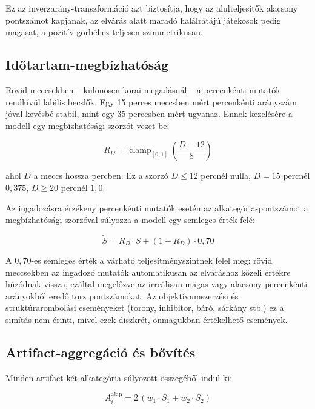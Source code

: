 ﻿\documentclass[a4paper,12pt]{report}
\begin{document}
Ez az inverzarány-transzformáció azt biztosítja, hogy az alulteljesítők alacsony pontszámot kapjanak, az elvárás alatt maradó halálrátájú játékosok pedig magasat, a pozitív görbéhez teljesen szimmetrikusan.

\subsection{Időtartam-megbízhatóság}

Rövid meccsekben -- különösen korai megadásnál -- a percenkénti mutatók rendkívül labilis becslők. Egy 15 perces meccsben mért percenkénti arányszám jóval kevésbé stabil, mint egy 35 percesben mért ugyanaz. Ennek kezelésére a modell egy megbízhatósági szorzót vezet be:

\begin{equation}
R_D = \operatorname{clamp}_{[0,1]}\!\left(\frac{D - 12}{8}\right)
\end{equation}

ahol $D$ a meccs hossza percben. Ez a szorzó $D \le 12$ percnél nulla, $D = 15$ percnél $0{,}375$, $D \ge 20$ percnél $1{,}0$.

Az ingadozásra érzékeny percenkénti mutatók esetén az alkategória-pontszámot a megbízhatósági szorzóval súlyozza a modell egy semleges érték felé:

\begin{equation}
\tilde{S} = R_D \cdot S + (1 - R_D) \cdot 0{,}70
\end{equation}

A $0{,}70$-es semleges érték a várható teljesítményszintnek felel meg: rövid meccsekben az ingadozó mutatók automatikusan az elváráshoz közeli értékre húzódnak vissza, ezáltal megelőzve az irreálisan magas vagy alacsony percenkénti arányokból eredő torz pontszámokat. Az objektívumszerzési és struktúrarombolási eseményeket (torony, inhibitor, báró, sárkány stb.) ez a simítás nem érinti, mivel ezek diszkrét, önmagukban értékelhető események.

\subsection{Artifact-aggregáció és bővítés}

Minden artifact két alkategória súlyozott összegéből indul ki:

\begin{equation}
A_i^{\text{alap}} = 2\,(w_1 \cdot S_1 + w_2 \cdot S_2)
\end{equation}
\end{document}
